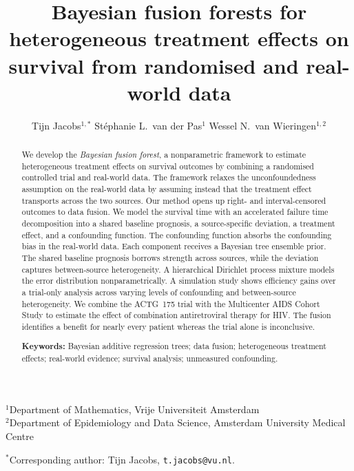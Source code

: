 \documentclass[11pt]{article}
\title{Bayesian fusion forests for heterogeneous treatment effects on survival from randomised and real-world data}
\author{
  Tijn Jacobs$^{1,\ast}$ \quad
  St\'ephanie L.\ van der Pas$^{1}$ \quad
  Wessel N.\ van Wieringen$^{1, 2}$
}
\date{}
\theoremstyle{plain}
\theoremstyle{definition}
\theoremstyle{remark}
\newcommand{\1}{\mathds{1}}
\begin{document}
\makeatletter
{}
\makeatother

\maketitle


\begin{center}
\begin{minipage}{0.9\textwidth}
\setlength{\parskip}{0.4em}
\small
\noindent
$^{1}$Department of Mathematics, Vrije Universiteit Amsterdam \\
$^{2}$Department of Epidemiology and Data Science, Amsterdam University Medical Centre

\noindent
$^{\ast}$Corresponding author: Tijn Jacobs, \texttt{t.jacobs@vu.nl}.
\end{minipage}
\end{center}


\begin{abstract}
We develop the \emph{Bayesian fusion forest}, a nonparametric framework to estimate heterogeneous treatment effects on survival outcomes by combining a randomised controlled trial and real-world data.
The framework relaxes the unconfoundedness assumption on the real-world data by assuming instead that the treatment effect transports across the two sources.
Our method opens up right- and interval-censored outcomes to data fusion.
We model the survival time with an accelerated failure time decomposition into a shared baseline prognosis, a source-specific deviation, a treatment effect, and a confounding function.
The confounding function absorbs the confounding bias in the real-world data.
Each component receives a Bayesian tree ensemble prior.
The shared baseline prognosis borrows strength across sources, while the deviation captures between-source heterogeneity.
A hierarchical Dirichlet process mixture models the error distribution nonparametrically.
A simulation study shows efficiency gains over a trial-only analysis across varying levels of confounding and between-source heterogeneity.
We combine the ACTG~175 trial with the Multicenter AIDS Cohort Study to estimate the effect of combination antiretroviral therapy for HIV.
The fusion identifies a benefit for nearly every patient whereas the trial alone is inconclusive.

\medskip
\noindent\textbf{Keywords:} Bayesian additive regression trees; data fusion; heterogeneous treatment effects; real-world evidence; survival analysis; unmeasured confounding.
\end{abstract}
\end{document}
